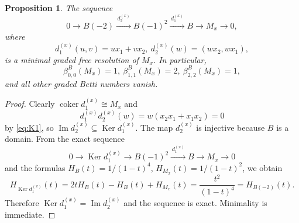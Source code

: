 \documentclass[10pt,a4paper]{amsart}
\newtheorem{proposition}{Proposition}
\begin{document}
\begin{proposition}\label{prop:Mx}
The sequence
\[
0\longrightarrow B(-2)\xrightarrow{\,d_2^{(x)}\,}B(-1)^2\xrightarrow{\,d_1^{(x)}\,}B\longrightarrow M_x\longrightarrow 0,
\]
where
\[
d_1^{(x)}(u,v)=ux_1+vx_2,
\
d_2^{(x)}(w)=(wx_2,wx_1),
\]
is a minimal graded free resolution of \(M_x\). In particular,
\[
\beta_{0,0}^B(M_x)=1,\
\beta_{1,1}^B(M_x)=2,\
\beta_{2,2}^B(M_x)=1,
\]
and all other graded Betti numbers vanish.
\end{proposition}

\begin{proof}
Clearly \(\operatorname{coker} d_1^{(x)}\cong M_x\) and
\[
d_1^{(x)}d_2^{(x)}(w)=w(x_2x_1+x_1x_2)=0
\]
by \eqref{eq:K1}, so \(\operatorname{Im}d_2^{(x)}\subseteq \operatorname{Ker} d_1^{(x)}\). The map \(d_2^{(x)}\) is injective because \(B\) is a domain. From the exact sequence
\[
0\longrightarrow \operatorname{Ker} d_1^{(x)}\longrightarrow B(-1)^2\xrightarrow{\,d_1^{(x)}\,}B\longrightarrow M_x\longrightarrow 0
\]
and the formulas \(H_B(t)=1/(1-t)^4\), \(H_{M_x}(t)=1/(1-t)^2\), we obtain
\[
H_{\operatorname{Ker} d_1^{(x)}}(t)
=
2tH_B(t)-H_B(t)+H_{M_x}(t)
=
\frac{t^2}{(1-t)^4}
=
H_{B(-2)}(t).
\]
Therefore \(\operatorname{Ker} d_1^{(x)}=\operatorname{Im}d_2^{(x)}\) and the sequence is exact. Minimality is immediate.
\end{proof}
\end{document}
